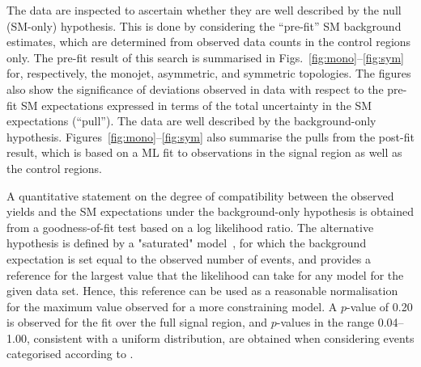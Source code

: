 
The data are inspected to ascertain whether they are well described by
the null (SM-only) hypothesis. This is done by considering the
``pre-fit'' SM background estimates, which are determined from
observed data counts in the control regions only. The pre-fit result
of this search is summarised in Figs.~\ref{fig:mono}--\ref{fig:sym}
for, respectively, the monojet, asymmetric, and symmetric
topologies. The figures also show the significance of deviations
observed in data with respect to the pre-fit SM expectations expressed
in terms of the total uncertainty in the SM expectations
(``pull''). The data are well described by the background-only
hypothesis. Figures~\ref{fig:mono}--\ref{fig:sym} also summarise the
pulls from the post-fit result, which is based on a ML fit to
observations in the signal region as well as the control regions.

A quantitative statement on the degree of compatibility between the
observed yields and the SM expectations under the background-only
hypothesis is obtained from a goodness-of-fit test based on a log
likelihood ratio. The alternative hypothesis is defined by a
"saturated" model~\cite{sat-llk}, for which the background expectation
is set equal to the observed number of events, and provides a
reference for the largest value that the likelihood can take for any
model for the given data set. Hence, this reference can be used as a
reasonable normalisation for the maximum value observed for a more
constraining model. A $p$-value of 0.20 is observed for the fit over
the full signal region, and $p$-values in the range 0.04--1.00,
consistent with a uniform distribution, are obtained when considering
events categorised according to \njet.

